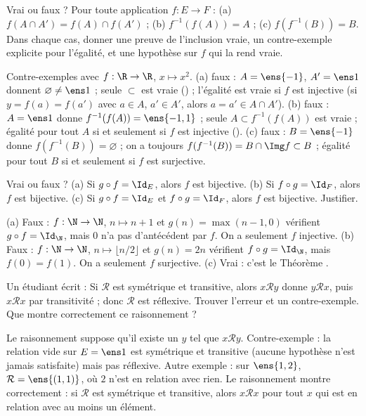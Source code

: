 \begin{exo}
Vrai ou faux ? Pour toute application $f:E\to F$ : (a) $f(A\cap A')=f(A)\cap f(A')$ ; (b) $f^{-1}(f(A))=A$ ; (c) $f(f^{-1}(B))=B$. Dans chaque cas, donner une preuve de l'inclusion vraie, un contre-exemple explicite pour l'égalité, et une hypothèse sur $f$ qui la rend vraie.
\begin{corrige}
Contre-exemples avec $f:\R\to\R$, $x\mapsto x^2$. (a) faux : $A=\ens{-1}$, $A'=\ens1$ donnent $\varnothing\neq\ens1$ ; seule $\subset$ est vraie () ; l'égalité est vraie si $f$ est injective (si $y=f(a)=f(a')$ avec $a\in A$, $a'\in A'$, alors $a=a'\in A\cap A'$). (b) faux : $A=\ens1$ donne $f^{-1}(f(A))=\ens{-1,1}$ ; seule $A\subset f^{-1}(f(A))$ est vraie ; égalité pour tout $A$ si et seulement si $f$ est injective (). (c) faux : $B=\ens{-1}$ donne $f(f^{-1}(B))=\varnothing$ ; on a toujours $f(f^{-1}(B))=B\cap\Img f\subset B$ ; égalité pour tout $B$ si et seulement si $f$ est surjective.
\end{corrige}
\end{exo}
\begin{exo}
Vrai ou faux ? (a) Si $g\circ f=\Id_E$, alors $f$ est bijective. (b) Si $f\circ g=\Id_F$, alors $f$ est bijective. (c) Si $g\circ f=\Id_E$ et $f\circ g=\Id_F$, alors $f$ est bijective. Justifier.
\begin{corrige}
(a) Faux : $f:\N\to\N$, $n\mapsto n+1$ et $g(n)=\max(n-1,0)$ vérifient $g\circ f=\Id_{\N}$, mais $0$ n'a pas d'antécédent par $f$. On a seulement $f$ injective.
(b) Faux : $f:\N\to\N$, $n\mapsto\lfloor n/2\rfloor$ et $g(n)=2n$ vérifient $f\circ g=\Id_{\N}$, mais $f(0)=f(1)$. On a seulement $f$ surjective.
(c) Vrai : c'est le Théorème .
\end{corrige}
\end{exo}
\begin{exo}
Un étudiant écrit : \og Si $\mathcal R$ est symétrique et transitive, alors $x\mathcal R y$ donne $y\mathcal R x$, puis $x\mathcal R x$ par transitivité ; donc $\mathcal R$ est réflexive. \fg{} Trouver l'erreur et un contre-exemple. Que montre correctement ce raisonnement ?
\begin{corrige}
Le raisonnement suppose qu'il existe un $y$ tel que $x\mathcal R y$. Contre-exemple : la relation vide sur $E=\ens1$ est symétrique et transitive (aucune hypothèse n'est jamais satisfaite) mais pas réflexive. Autre exemple : sur $\ens{1,2}$, $\mathcal R=\ens{(1,1)}$, où $2$ n'est en relation avec rien. Le raisonnement montre correctement : si $\mathcal R$ est symétrique et transitive, alors $x\mathcal R x$ pour tout $x$ qui est en relation avec au moins un élément.
\end{corrige}
\end{exo}
